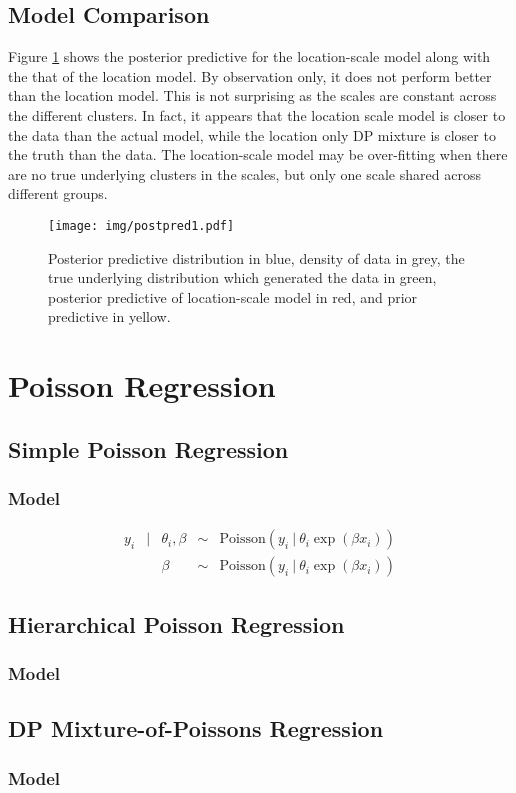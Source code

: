 \documentclass{article}
\def\beginmyfig{\begin{figure}[h]\center}
\def\endmyfig{\end{figure}}
\begin{document}
\subsection{Model Comparison}
Figure \ref{fig:postpred1} shows the posterior predictive for the location-scale model
along with the that of the location model. By observation only, it does not perform better
than the location model. This is not surprising as the scales are constant across the different 
clusters. In fact, it appears that the location scale model is closer to the data than the 
actual model, while the location only DP mixture is closer to the truth than the data. The 
location-scale model may be over-fitting when there are no true underlying clusters in the
scales, but only one scale shared across different groups.
\beginmyfig
  \texttt{[image: img/postpred1.pdf]}
  \caption{Posterior predictive distribution in blue, density of data in grey, the true
  underlying distribution which generated the data in green, posterior predictive of
  location-scale model in red, and prior predictive in yellow.}
  \label{fig:postpred1}
\endmyfig

\section{Poisson Regression}
\subsection{Simple Poisson Regression}
\subsubsection{Model}
\[
\begin{array}{rclcl}
  y_i &|& \theta_i, \beta &\sim& \text{Poisson}(y_i~|~\theta_i\exp{(\beta x_i)})\\
  && \beta   &\sim& \text{Poisson}(y_i~|~\theta_i\exp{(\beta x_i)})
\end{array}
\]
\subsection{Hierarchical Poisson Regression}
\subsubsection{Model}
\subsection{DP Mixture-of-Poissons Regression}
\subsubsection{Model}
\end{document}
